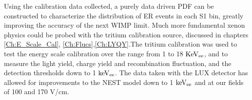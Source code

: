 Using the calibration data collected, a purely data driven PDF can be constructed to characterize the distribution of ER events in each S1 bin, greatly improving the accuracy of the next WIMP limit. Much more fundamental xenon physics could be probed with the tritium calibration source, discussed in chapters \ref{Ch:E_Scale_Cal}, \ref{Ch:Flucs},\ref{Ch:LYQY}.The tritium calibration was used to test the energy scale calibration over the range from 1 to 18 $\rm KeV_{ee}$, and to measure the light yield, charge yield and recombination fluctuation, and the detection thresholds down to 1 $\rm keV_{ee}$. The data taken with the LUX detector has allowed for improvements to the NEST model down to 1 $\rm keV_{ee}$ and at our fields of 100 and 170 V/cm. 


